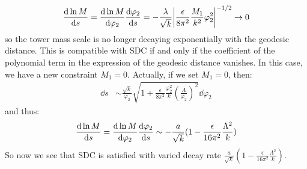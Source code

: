 \begin{align}
    \dv{\ln M}{s} = \dv{\ln M}{\varphi_{2}}\dv{\varphi_{2}}{s} = -\frac{\lambda}{\sqrt{k}}\abs{\frac{\epsilon}{8\pi^{2}} \frac{M_{1}}{k^{2}}\varphi_{2}^{2}}^{-1/2} \rightarrow 0
\end{align}
so the tower mass scale is no longer decaying exponentially with the geodesic distance. This is compatible with SDC if and only if the coefficient of the polynomial term in the expression of the geodesic distance vanishes. In this case, we have a new constraint $M_{1} = 0$. Actually, if we set $M_{1} =0$, then:
\begin{align}
    \dd s &\sim \frac{\sqrt{k}}{\varphi_{2}} \sqrt{1 + \frac{\epsilon}{8\pi^{2}} \frac{\varphi_{2}^{2}}{k} (\frac{\Lambda}{\varphi_{2}})^{2} }\dd \varphi_{2}
\end{align}
and thus:
\begin{align}
    \dv{\ln M}{s} = \dv{\ln M}{\varphi_{2}} \dv{\varphi_{2}}{s} \sim -\frac{a}{\sqrt{k}}(1 - \frac{\epsilon}{16\pi^{2}}\frac{\Lambda ^{2}}{k})
\end{align}
So now we see that SDC is satisfied with varied decay rate $\frac{a}{\sqrt{k}}(1- \frac{\epsilon}{16\pi^{2}}\frac{\Lambda ^{2}}{k})$.

